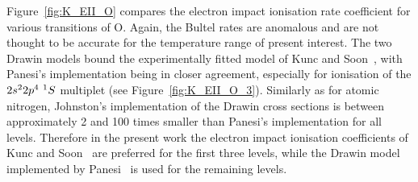 {\par

Figure~\ref{fig:K_EII_O} compares the electron impact ionisation rate coefficient for various transitions of O.
Again, the Bultel rates are anomalous and are not thought to be accurate for the temperature range of present interest.
The two Drawin models bound the experimentally fitted model of Kunc and Soon~\cite{KS1989}, with Panesi's implementation being in closer agreement, especially for ionisation of the $2s^2 2p^4 \text{ } ^1S$ multiplet (see Figure~\ref{fig:K_EII_O_3}).
Similarly as for atomic nitrogen, Johnston's implementation of the Drawin cross sections is between approximately 2 and 100 times smaller than Panesi's implementation for all levels.
Therefore in the present work the electron impact ionisation coefficients of Kunc and Soon~\cite{KS1989} are preferred for the first three levels, while the Drawin model implemented by Panesi~\cite{JohnPhd} is used for the remaining levels.

}
